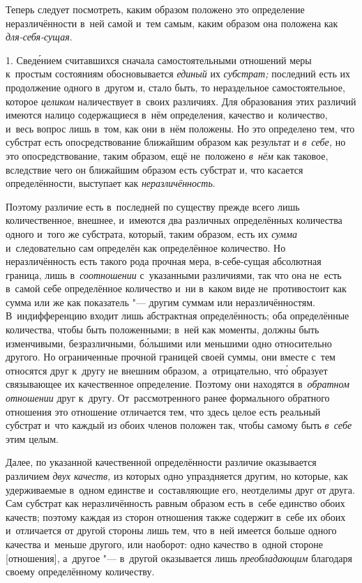 
Теперь следует посмотреть, каким образом положено это определение
неразличённости в~ней самой и~тем самым, каким образом она положена
как {\em для-себя-сущая}.

1. Свед\'{е}нием считавшихся сначала самостоятельными отношений меры
к~простым состояниям обосновывается {\em единый} их {\em субстрат;} последний
есть их продолжение одного в~другом и, стало быть, то нераздельное
самостоятельное, которое {\em целиком} наличествует в~своих различиях.
Для образования этих различий имеются налицо содержащиеся в~нём определения,
качество и~количество, и~весь вопрос лишь в~том, как они в~нём положены.
Но это определено тем, что субстрат есть опосредствование ближайшим образом
как результат и {\em в~себе,} но это опосредствование, таким образом, ещё
не~положено {\em в~нём} как таковое, вследствие чего он ближайшим образом есть
субстрат и, что касается определённости, выступает как {\em неразличённость}.

Поэтому различие есть в~последней по существу прежде всего лишь количественное,
внешнее, и~имеются два различных определённых количества одного и~того же
субстрата, который, таким образом, есть их {\em сумма} и~следовательно сам
определён как определённое количество. Но неразличённость есть такого рода
прочная мера, в-себе-сущая абсолютная граница, лишь в~{\em соотношении}
с~указанными различиями, так что она не~есть в~самой себе определённое
количество и~ни в~каком виде не~противостоит как сумма или же как
показатель "--- другим суммам или неразличённостям. В~индифференцию входит
лишь абстрактная определённость; оба определённые количества, чтобы быть
положенными; в~ней как моменты, должны быть изменчивыми, безразличными,
б\'{о}льшими или меньшими одно относительно другого. Но ограниченные прочной
границей своей суммы, они вместе с~тем относятся друг к~другу не внешним
образом, а~отрицательно, чт\'{о} образует связывающее их качественное
определение. Поэтому они находятся в~{\em обратном отношении} друг к~другу.
От~рассмотренного ранее формального обратного отношения это отношение
отличается тем, что здесь целое есть реальный субстрат и~что каждый из обоих
членов положен так, чтобы самому быть {\em в~себе} этим целым.

Далее, по указанной качественной определённости различие оказывается различием
{\em двух качеств,} из которых одно упраздняется другим, но которые, как
удерживаемые в~одном единстве и~составляющие его, неотделимы друг от друга. Сам
субстрат как неразличённость равным образом есть в~себе единство обоих качеств;
поэтому каждая из сторон отношения также содержит в~себе их обоих и~отличается
от другой стороны лишь тем, что в~ней имеется больше одного качества и~меньше
другого, или наоборот: одно качество в~одной стороне [отношения], а~другое "--- в~другой
оказывается лишь {\em преобладающим} благодаря своему определённому количеству.

